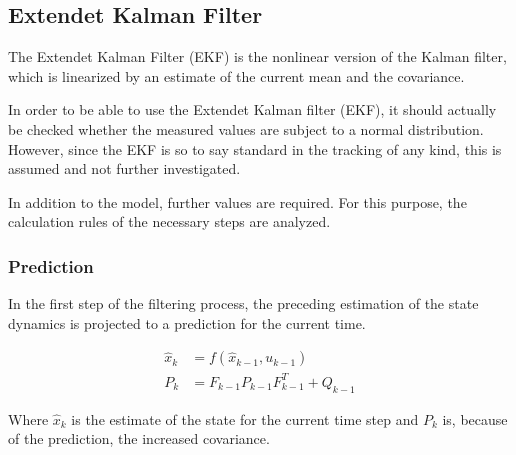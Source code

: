 \documentclass[11pt,oneside,openright]{mpreport}
\begin{document}
\subsection{Extendet Kalman Filter}



The Extendet Kalman Filter (EKF) \cite{Ribeiro2004} is the nonlinear version of the Kalman filter, which is linearized by an estimate of the current mean and the covariance.

In order to be able to use the Extendet Kalman filter (EKF), it should actually be checked whether the measured values
are subject to a normal distribution. However, since the EKF is so to say 
standard in the tracking of any kind\cite{Li2010, Wan2006}, this is assumed and not further investigated.

In addition to the model, further values are required. For this purpose, the calculation rules of the necessary steps are analyzed.

\subsubsection{Prediction}

In the first step of the filtering process, the preceding estimation of the state dynamics is projected to a prediction for the current time.

\begin{align*}
\hat{x}_{k} &= f(\hat{x}_{k-1},u_{k-1})\\
P_{k}&=F_{k-1} P_{k-1} {F^T_{k-1}} + Q_{k-1}
\end{align*}

Where $\hat{x}_{k}$ is the estimate of the state for the current time step and $P_{k}$ is, because of the prediction, the increased covariance.

\end{document}

